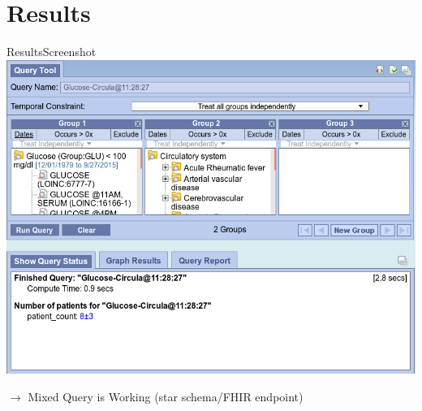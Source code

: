\documentclass[10pt]{beamer}
\begin{document}
\section{Results}
\begin{frame}{Results}{Screenshot}
\includegraphics[height=.7\textheight]{images/demo.png}

	$\rightarrow$ Mixed Query is Working (star schema/FHIR endpoint)
\end{frame}
\end{document}
